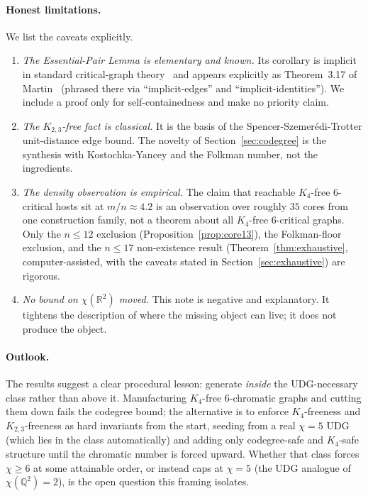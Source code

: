 \documentclass[11pt]{article}
\theoremstyle{definition}
\newcommand{\R}{\mathbb{R}}
\newcommand{\Q}{\mathbb{Q}}
\newcommand{\chrom}{\chi}
\begin{document}
\paragraph{Honest limitations.} We list the caveats explicitly.
\begin{enumerate}
  \item \emph{The Essential-Pair Lemma is elementary and known.} Its corollary is
        implicit in standard critical-graph theory~\cite{JensenToft1995} and
        appears explicitly as Theorem~3.17 of Martin~\cite{Martin2009} (phrased
        there via ``implicit-edges'' and ``implicit-identities''). We include a
        proof only for self-containedness and make no priority claim.
  \item \emph{The $K_{2,3}$-free fact is classical.} It is the basis of the
        Spencer-Szemer\'edi-Trotter unit-distance edge bound. The novelty of
        Section~\ref{sec:codegree} is the synthesis with Kostochka-Yancey and the
        Folkman number, not the ingredients.
  \item \emph{The density observation is empirical.} The claim that reachable
        $K_4$-free $6$-critical hosts sit at $m/n \approx 4.2$ is an observation
        over roughly $35$ cores from one construction family, not a theorem about
        all $K_4$-free $6$-critical graphs. Only the $n \le 12$ exclusion
        (Proposition~\ref{prop:core13}), the Folkman-floor exclusion, and the
        $n \le 17$ non-existence result (Theorem~\ref{thm:exhaustive},
        computer-assisted, with the caveats stated in
        Section~\ref{sec:exhaustive}) are rigorous.
  \item \emph{No bound on $\chrom(\R^2)$ moved.} This note is negative and
        explanatory. It tightens the description of where the missing object can
        live; it does not produce the object.
\end{enumerate}

\paragraph{Outlook.} The results suggest a clear procedural lesson: generate
\emph{inside} the UDG-necessary class rather than above it. Manufacturing
$K_4$-free $6$-chromatic graphs and cutting them down fails the codegree bound;
the alternative is to enforce $K_4$-freeness and $K_{2,3}$-freeness as hard
invariants from the start, seeding from a real $\chrom = 5$ UDG (which lies in the
class automatically) and adding only codegree-safe and $K_4$-safe structure until
the chromatic number is forced upward. Whether that class forces $\chrom \ge 6$ at
some attainable order, or instead caps at $\chrom = 5$ (the UDG analogue of
$\chrom(\Q^2) = 2$), is the open question this framing isolates.
\end{document}
